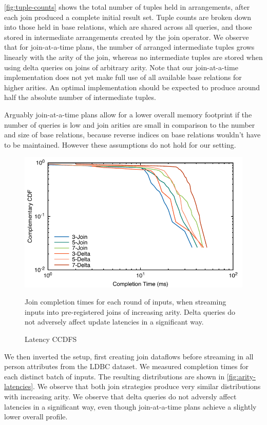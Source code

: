 \documentclass[../catalog.tex]{subfiles}
\begin{document}
\autoref{fig:tuple-counts} shows the total number of tuples held in
arrangements, after each join produced a complete initial result
set. Tuple counts are broken down into those held in base relations,
which are shared across all queries, and those stored in intermediate
arrangements created by the join operator. We observe that for
join-at-a-time plans, the number of arranged intermediate tuples grows
linearly with the arity of the join, whereas no intermediate tuples
are stored when using delta queries on joins of arbitrary arity. Note
that our join-at-a-time implementation does not yet make full use of
all available base relations for higher arities. An optimal
implementation should be expected to produce around half the absolute
number of intermediate tuples.

Arguably join-at-a-time plans allow for a lower overall memory
footprint if the number of queries is low and join arities are small
in comparison to the number and size of base relations, because
reverse indices on base relations wouldn't have to be
maintained. However these assumptions do not hold for our setting.

\begin{figure}[h!]
  \includegraphics[width=1.0\linewidth]{results/join-state/out/all_cdfs}
  \caption{Latency CCDFS}
  \label{fig:arity-latencies}
  \medskip
  \small

  Join completion times for each round of inputs, when streaming
  inputs into pre-registered joins of increasing arity. Delta queries
  do not adversely affect update latencies in a significant way.
\end{figure}

We then inverted the setup, first creating join dataflows before
streaming in all person attributes from the LDBC dataset. We measured
completion times for each distinct batch of inputs. The resulting
distributions are shown in \autoref{fig:arity-latencies}. We observe
that both join strategies produce very similar distributions with
increasing arity. We observe that delta queries do not adversly affect
latencies in a significant way, even though join-at-a-time plans
achieve a slightly lower overall profile.
\end{document}

